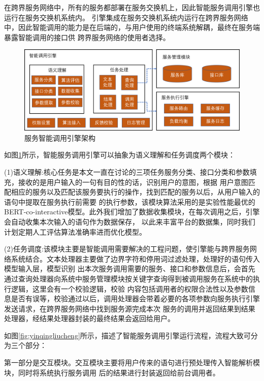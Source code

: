 在跨界服务网络中，所有的服务都部署在服务交换机上，因此智能服务调用引擎也运行在服务交换机系统内。
引擎集成在服务交换机系统内运行在跨界服务网络中，因此智能调用的能力是在后端的，与用户使用的终端系统解耦，最终在服务端暴露智能调用的接口供
跨界服务网络的使用者选择。

\begin{figure}[htbp]
  \centering
  \includegraphics[width=15cm]{./images/yinqing.png}
  \caption{服务智能调用引擎架构}
  \label{fig:yinqing}
\end{figure}

如图\ref{fig:yinqing}所示，智能服务调用引擎可以抽象为语义理解和任务调度两个模块：

(1)语义理解:核心任务是本文一直在讨论的三项任务服务分类、接口分类和参数填充，接收的是用户输入的一句有目的性的话，识别用户的意图，根据
用户意图匹配相应的服务以及匹配该服务要执行的操作，找到匹配的服务以后，从用户输入的语句中提取在服务执行前需要
的执行参数，该模块算法采用的是实验性能最优的BERT-co-interactive模型。此外我们增加了数据收集模块，在每次调用之后，引擎会自动收集本次输入的语句作为数据保存，
以此来丰富平台的数据集，同时我们计划定期人工评估算法准确率进而优化模型。

(2)任务调度:该模块主要是智能调用需要解决的工程问题，使引擎能与跨界服务网络系统结合。文本处理器主要做了边界字符和停用词过滤处理，处理好的语句传入模型输入层，模型识别
出本次服务调用需要的服务、接口和参数信息后，会首先通过查询处理器向系统中服务管理模块按关键字查询得到被调用服务在系统中的执行逻辑，这里会有一个校验逻辑，校验
内容包括调用者的权限合法性以及参数信息是否有误等，校验通过以后，调用处理器会带着必要的各项参数向服务执行引擎发送请求，在跨界服务网络中找到服务源完成本次
服务的调用并返回结果到结果处理器，经结果处理器封装的最终结果会返回给用户。

如图\ref{fig:yinqingliucheng}所示，描述了智能服务调用引擎运行流程，流程大致可分为三个部分：

第一部分是交互模块。交互模块主要将用户传来的语句进行预处理传入智能解析模块，同时将系统执行服务调用
后的结果进行封装返回给前台调用者。

